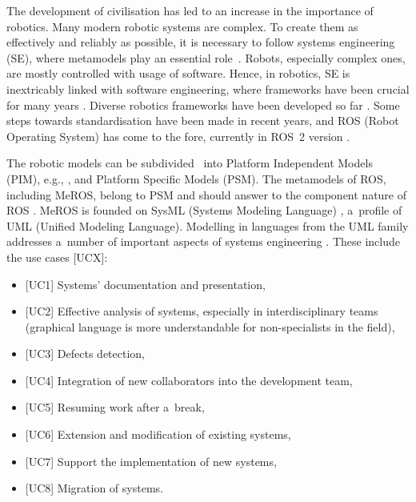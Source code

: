 \documentclass[11pt,oneside,a4paper]{report}
\begin{document}
	The development of civilisation has led to an increase in the importance of robotics. Many modern robotic systems are complex. To create them as effectively and reliably as possible, it is necessary to follow systems engineering (SE), where metamodels play an essential role~\cite{bezivin2004search,schmidt2006model,kent2002model}.
	Robots, especially complex ones, are mostly controlled with usage of software. Hence, in robotics, SE is inextricably linked with software engineering, where frameworks have been crucial for many years \cite{mnkandla2009software,shehory2014agent}.
	Diverse robotics frameworks have been developed so far \cite{inigo2012robotics,tsardoulias2017robotic,hentout2016survey}. Some steps towards standardisation have been made in recent years, and ROS (Robot Operating System) has come to the fore, currently in ROS~2 version \cite{maruyama2016exploring,park2020real}.   
	
	The robotic models can be subdivided~\cite{de2021survey} into Platform Independent Models (PIM), e.g., \cite{zielinski2017variable,zielinski2010motion,tasker2020,earl2020}, and Platform Specific Models (PSM). The metamodels of ROS, including MeROS, belong to PSM and should answer to the component nature of ROS \cite{Figat:2022:RAS,wenger2016model}.
	 MeROS is founded on SysML (Systems Modeling Language) \cite{omg-sysml17,Friedenthal:2015}, a~profile of UML (Unified Modeling Language). Modelling in languages from the UML family addresses a~number of important aspects of systems engineering \cite{chaudron2012effective}. These include the use cases [UCX]:
	\begin{itemize}
		\item $[$UC1] Systems' documentation and presentation,
		\item $[$UC2] Effective analysis of systems, especially in interdisciplinary teams (graphical language is more understandable for non-specialists in the field), 
		\item $[$UC3] Defects detection,
		\item $[$UC4] Integration of new collaborators into the development team,
		\item $[$UC5] Resuming work after a~break,
		\item $[$UC6] Extension and modification of existing systems,
		\item $[$UC7] Support the implementation of new systems,
		\item $[$UC8] Migration of systems.
	\end{itemize}
	
\end{document}
